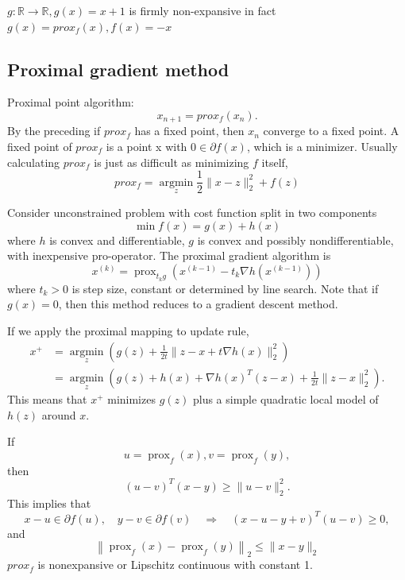 \begin{example}
$ g: \mathbb{R} \rightarrow \mathbb{R}, g(x)=x+1$ is firmly non-expansive in fact $ g(x)=prox_{f}(x), f(x)=-x$
	\end{example}
	
\subsection{Proximal gradient method}	
Proximal point algorithm: 
$$ 
x_{n+1}=prox_{f}(x_{n}).
$$ 
By the preceding if $ prox_{f}$ has a fixed point, then $ x_{n} $ converge to a fixed point.
A fixed point of $ prox_{f}$ is a point x with $0 \in \partial f(x) $, which is a minimizer.
Usually calculating $ prox_{f}$ is just as difficult as minimizing $f$ itself,
$$
prox_{f}=\mathop{argmin}\limits_{z} \frac{1}{2}\|x-z\|_2^{2}+f(z)
$$


Consider unconstrained problem with cost function split in two components
$$
\min f(x)=g(x)+h(x)
$$
where $h$ is convex and differentiable, 
$g$ is convex and possibly nondifferentiable, with inexpensive pro-operator.
The proximal gradient algorithm is
$$
x^{(k)}=\operatorname{prox}_{t_{k} g}\left(x^{(k-1)}-t_{k} \nabla h\left(x^{(k-1)}\right)\right)
$$
where $t_{k}>0$ is step size, constant or determined by line search. Note that if $g(x)=0$, then this method reduces to a gradient descent method.

If we apply the proximal mapping to update rule,
$$
\begin{aligned}
x^{+} &=\underset{z}{\operatorname{argmin}}\left(g(z)+\frac{1}{2 t}\|z-x+t \nabla h(x)\|_{2}^{2}\right) \\
&=\underset{z}{\operatorname{argmin}}\left(g(z)+h(x)+\nabla h(x)^{T}(z-x)+\frac{1}{2 t}\|z-x\|_{2}^{2}\right).
\end{aligned}
$$
This means that
$x^{+}$ minimizes $g(z)$ plus a simple quadratic local model of $h(z)$ around $x$.

\begin{properties}
If 
$$
u=\operatorname{prox}_{f}(x), v= \operatorname{prox}_{f}(y),
$$
then 
$$
(u-v)^{T}(x-y) \geq\|u-v\|_{2}^{2}.
$$
This implies that 
$$
x-u \in \partial f(u), \quad y-v \in \partial f(v) \quad \Longrightarrow \quad(x-u-y+v)^{T}(u-v) \geq 0,
$$
and 
$$
\left\|\operatorname{prox}_{f}(x)-\operatorname{prox}_{f}(y)\right\|_{2} \leq\|x-y\|_{2}
$$
$prox_{f}$ is nonexpansive or Lipschitz continuous with constant 1.
\end{properties}

